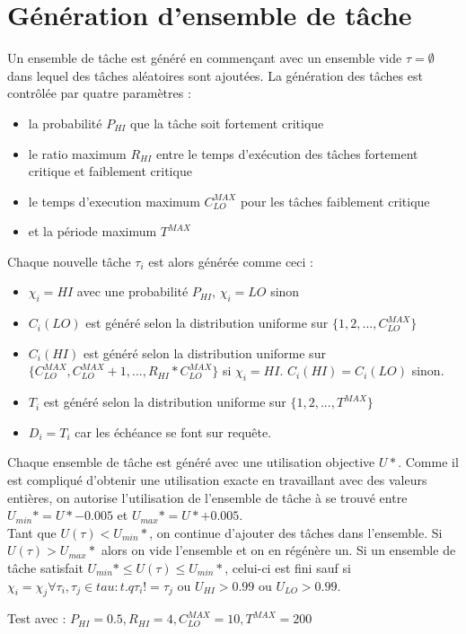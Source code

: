 \documentclass[a4paper]{report}
\theoremstyle{break}
\theoremstyle{breakplain}
\begin{document}
\section{Génération d'ensemble de tâche}
Un ensemble de tâche est généré\cite{ekberg2014bounding} en commençant avec un ensemble vide $\tau = \emptyset$ dans lequel des tâches aléatoires sont ajoutées. La génération des tâches est contrôlée par quatre paramètres :
\begin{itemize}
\item la probabilité $P_{HI}$ que la tâche soit fortement critique
\item le ratio maximum $R_{HI}$ entre le temps d'exécution des tâches fortement critique et faiblement critique
\item le temps d'execution maximum $C^{MAX}_{LO}$ pour les tâches faiblement critique
\item et la période maximum $T^{MAX}$
\end{itemize}
Chaque nouvelle tâche $\tau_i$ est alors générée comme ceci :
\begin{itemize}
\item $\chi_i = HI$ avec une probabilité $P_{HI}$, $\chi_i = LO$ sinon
\item $C_i(LO)$ est généré selon la distribution uniforme sur $\{1,2,...,C^{MAX}_{LO}\}$
\item $C_i(HI)$ est généré selon la distribution uniforme sur $\{C^{MAX}_{LO},C^{MAX}_{LO}+1,...,R_{HI}*C^{MAX}_{LO}\}$ si $\chi_i = HI$. $C_i(HI) = C_i(LO)$ sinon.
\item $T_i$ est généré selon la distribution uniforme sur $\{1,2,...,T^{MAX}\}$
\item $D_i = T_i$ car les échéance se font sur requête.
\end{itemize}

Chaque ensemble de tâche est généré avec une utilisation objective $U*$. Comme il est compliqué d'obtenir une utilisation exacte en travaillant avec des valeurs entières, on autorise l'utilisation de l'ensemble de tâche à se trouvé entre $U_{min}* = U*-0.005$ et $U_{max}* = U*+0.005$.\\
Tant que $U(\tau) < U_{min}*$, on continue d'ajouter des tâches dans l'ensemble. Si $U(\tau) > U_{max}*$ alors on vide l'ensemble et on en régénère un. Si un ensemble de tâche satisfait $U_{min}* \leq U(\tau) \leq  U_{min}*$, celui-ci est fini sauf si $\chi_i = \chi_j \forall \tau_i,\tau_j \in tau : t.q \tau_i != \tau_j$ ou $U_{HI} > 0.99$ ou $U_{LO} > 0.99$.

Test avec : $P_{HI} = 0.5, R_{HI} = 4, C^{MAX}_{LO} = 10, T^{MAX} = 200$


%

\end{document}
